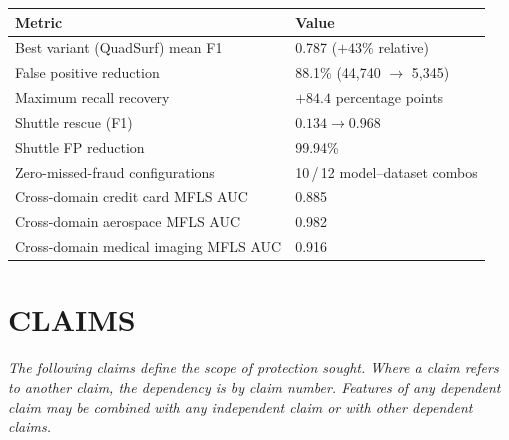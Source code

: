 \documentclass[12pt,a4paper]{article}
\begin{document}
\begin{center}
\begin{tabular}{ll}
\toprule
\textbf{Metric} & \textbf{Value} \\
\midrule
Best variant (QuadSurf) mean F1 & 0.787 \quad ($+43\%$ relative) \\
False positive reduction & 88.1\% (44,740 $\to$ 5,345) \\
Maximum recall recovery & $+84.4$ percentage points \\
Shuttle rescue (F1) & $0.134\to 0.968$ \\
Shuttle FP reduction & 99.94\% \\
Zero-missed-fraud configurations & 10\,/\,12 model--dataset combos \\
Cross-domain credit card MFLS AUC & 0.885 \\
Cross-domain aerospace MFLS AUC & 0.982 \\
Cross-domain medical imaging MFLS AUC & 0.916 \\
\bottomrule
\end{tabular}
\end{center}

\section{CLAIMS}

\noindent\textit{The following claims define the scope of protection
sought. Where a claim refers to another claim, the dependency is by claim
number. Features of any dependent claim may be combined with any independent
claim or with other dependent claims.}
\vspace{0.8em}
\end{document}

